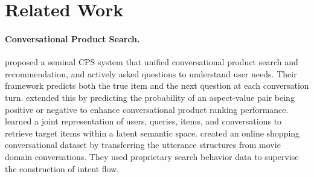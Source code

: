 \section{Related Work}
\label{sec:related_work}

\vspace{-0.5em}
\paragraph{Conversational Product Search.}

\citet{zhang2018towards} proposed a seminal CPS system that unified conversational product search and recommendation, and actively asked questions to understand user needs. 
Their framework predicts both the true item and the next question at each conversation turn. 
\citet{bi2019conversational} extended this by predicting the probability of an aspect-value pair being positive or negative to enhance conversational product ranking performance. 
\citet{zou2022learning} learned a joint representation of users, queries, items, and conversations to retrieve target items within a latent semantic space. 
\citet{xiao-etal-2021-end} created an online shopping conversational dataset by transferring the utterance structures from movie domain conversations. They used proprietary search behavior data to supervise the construction of intent flow.%

